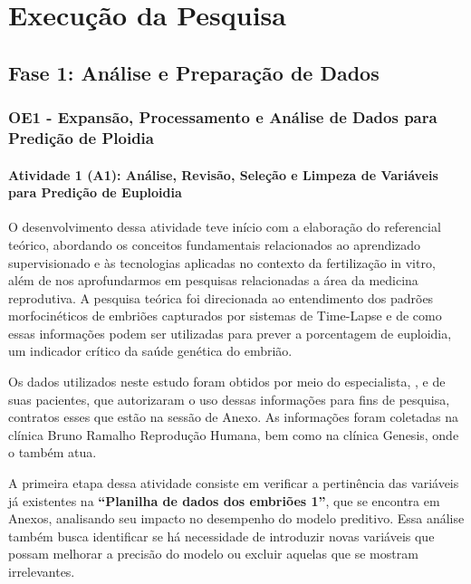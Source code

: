 \chapter[Metodologia]{Execução da Pesquisa}

\section{Fase 1: Análise e Preparação de Dados}
\subsection{OE1 - Expansão, Processamento e Análise de Dados para Predição de Ploidia}
\subsubsection{Atividade 1 (A1): Análise, Revisão, Seleção e Limpeza de Variáveis para Predição de Euploidia}
O desenvolvimento dessa atividade teve início com a elaboração do referencial teórico, abordando os conceitos fundamentais relacionados ao aprendizado supervisionado e às tecnologias aplicadas no contexto da fertilização in vitro, além de nos aprofundarmos em pesquisas relacionadas a área da medicina reprodutiva. A pesquisa teórica foi direcionada ao entendimento dos padrões morfocinéticos de embriões capturados por sistemas de Time-Lapse e de como essas informações podem ser utilizadas para prever a porcentagem de euploidia, um indicador crítico da saúde genética do embrião.

Os dados utilizados neste estudo foram obtidos por meio do especialista, , e de suas pacientes, que autorizaram o uso dessas informações para fins de pesquisa, contratos esses que estão na sessão de Anexo. As informações foram coletadas na clínica Bruno Ramalho Reprodução Humana, bem como na clínica Genesis, onde o  também atua.

A primeira etapa dessa atividade consiste em verificar a pertinência das variáveis já existentes na \textbf{“Planilha de dados dos embriões 1”}, que se encontra em Anexos, analisando seu impacto no desempenho do modelo preditivo. Essa análise também busca identificar se há necessidade de introduzir novas variáveis que possam melhorar a precisão do modelo ou excluir aquelas que se mostram irrelevantes.

